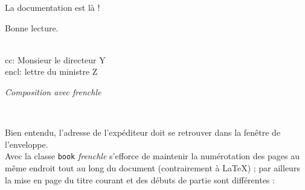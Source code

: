 \documentclass[a4paper,12pt,openright]{article}
\begin{document}
\begin{center}
{{\begin{minipage}{61mm}
La documentation est là !\\[1ex]
\centerline{\phantom{Bonne lecture.}Bonne lecture.}\\[11ex]
cc: Monsieur le directeur Y\\[.5ex]
encl: lettre du ministre Z
\end{minipage}
}
}%
\parbox[t]{66mm}{
\begin{center} \frenchtypography \frenchlayout
\textit{Composition avec frenchle}  
\end{center}
}\\[1.5em]
%
\end{center} %

Bien entendu, l’adresse de l’expéditeur doit se retrouver dans la fenêtre de
l’enveloppe.\\


Avec la classe \texttt{book} \textit{frenchle} s’efforce de maintenir la numérotation des
pages au même endroit tout au long du document (contrairement à \LaTeX) ; par
ailleurs la mise en page du titre courant et des débuts de partie sont différentes :
\end{document}
